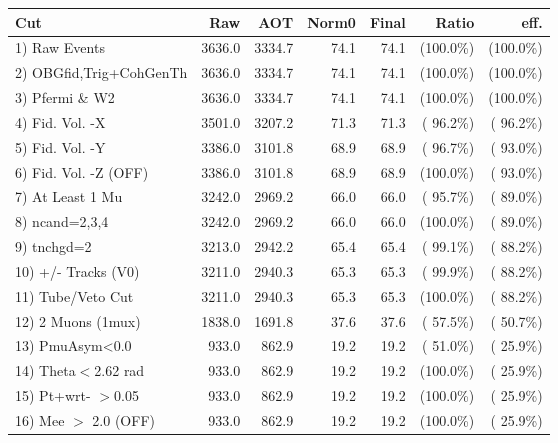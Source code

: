  \begin{table}[h!]\centering
 \begin{tabular}{||l||r|r|r|r|r|r||}
 \hline
 \hline
 Cut & Raw & AOT & Norm0 & Final & Ratio & eff.       \\
 \hline
  1) Raw Events           &       3636.0 &       3334.7 &         74.1 &         74.1 & (100.0\%) & (100.0\%) \\
  2) OBGfid,Trig+CohGenTh &       3636.0 &       3334.7 &         74.1 &         74.1 & (100.0\%) & (100.0\%) \\
  3) Pfermi \& W2         &       3636.0 &       3334.7 &         74.1 &         74.1 & (100.0\%) & (100.0\%) \\
  4) Fid. Vol. -X         &       3501.0 &       3207.2 &         71.3 &         71.3 & ( 96.2\%) & ( 96.2\%) \\
  5) Fid. Vol. -Y         &       3386.0 &       3101.8 &         68.9 &         68.9 & ( 96.7\%) & ( 93.0\%) \\
  6) Fid. Vol. -Z (OFF)   &       3386.0 &       3101.8 &         68.9 &         68.9 & (100.0\%) & ( 93.0\%) \\
  7) At Least 1 Mu        &       3242.0 &       2969.2 &         66.0 &         66.0 & ( 95.7\%) & ( 89.0\%) \\
  8) ncand=2,3,4          &       3242.0 &       2969.2 &         66.0 &         66.0 & (100.0\%) & ( 89.0\%) \\
  9) tnchgd=2             &       3213.0 &       2942.2 &         65.4 &         65.4 & ( 99.1\%) & ( 88.2\%) \\
 10) +/- Tracks (V0)      &       3211.0 &       2940.3 &         65.3 &         65.3 & ( 99.9\%) & ( 88.2\%) \\
 11) Tube/Veto Cut        &       3211.0 &       2940.3 &         65.3 &         65.3 & (100.0\%) & ( 88.2\%) \\
 12) 2 Muons (1mux)       &       1838.0 &       1691.8 &         37.6 &         37.6 & ( 57.5\%) & ( 50.7\%) \\
 13) PmuAsym<0.0          &        933.0 &        862.9 &         19.2 &         19.2 & ( 51.0\%) & ( 25.9\%) \\
 14) Theta$<$2.62 rad     &        933.0 &        862.9 &         19.2 &         19.2 & (100.0\%) & ( 25.9\%) \\
 15) Pt+wrt- $>$0.05      &        933.0 &        862.9 &         19.2 &         19.2 & (100.0\%) & ( 25.9\%) \\
 16) Mee $>$ 2.0  (OFF)   &        933.0 &        862.9 &         19.2 &         19.2 & (100.0\%) & ( 25.9\%) \\

\end{tabular}
\end{table}
